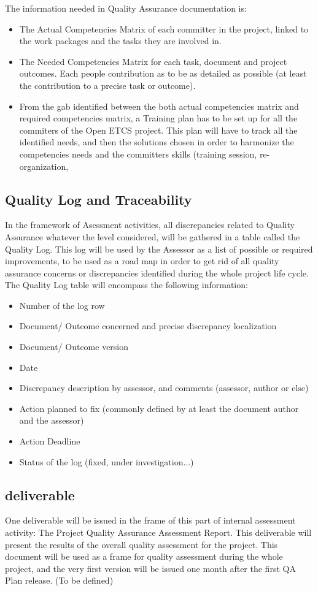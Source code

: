 \documentclass{template/openetcs_article}
\begin{document}
The information needed in Quality Assurance documentation is:
\begin{itemize}
\item The Actual Competencies Matrix of each committer in the project, linked to the work packages and the tasks they are involved in.
\item The Needed Competencies Matrix for each task, document and project outcomes. Each people contribution as to be as detailed as possible (at least the contribution to a precise task or outcome).
\item From the gab identified between the both actual competencies matrix and required competencies matrix, a Training plan has to be set up for all the commiters of the Open ETCS project. This plan will have to track all the identified needs, and then the solutions chosen in order to harmonize the competencies needs and the committers skills (training session, re-organization, 
\end{itemize}

\subsection{Quality Log and Traceability}
In the framework of Asessment activities, all discrepancies related to Quality Assurance whatever the level considered, will be gathered in a table called the Quality Log. This log will be used by the Assessor as a list of possible or required improvements, to be used as a road map in order to get rid of all quality assurance concerns or discrepancies identified during the whole project life cycle.
The Quality Log table will encompass the following information: 
\begin{itemize}
\item Number of the log row
\item Document/ Outcome concerned and precise discrepancy localization
\item Document/ Outcome version
\item Date
\item Discrepancy description by assessor, and comments (assessor, author or else)
\item Action planned to fix (commonly defined by at least the document author and the assessor)
\item Action Deadline
\item Status of the log (fixed, under investigation...)
\end{itemize}

\subsection{deliverable}
One deliverable will be issued in the frame of this part of internal assessment activity: The Project Quality Assurance Assessment Report. This deliverable will present the results of the overall quality assessment for the project.
This document will be used as a frame for quality assessment during the whole project, and the very first version will be issued one month after the first QA Plan release. (To be defined)
\end{document}
